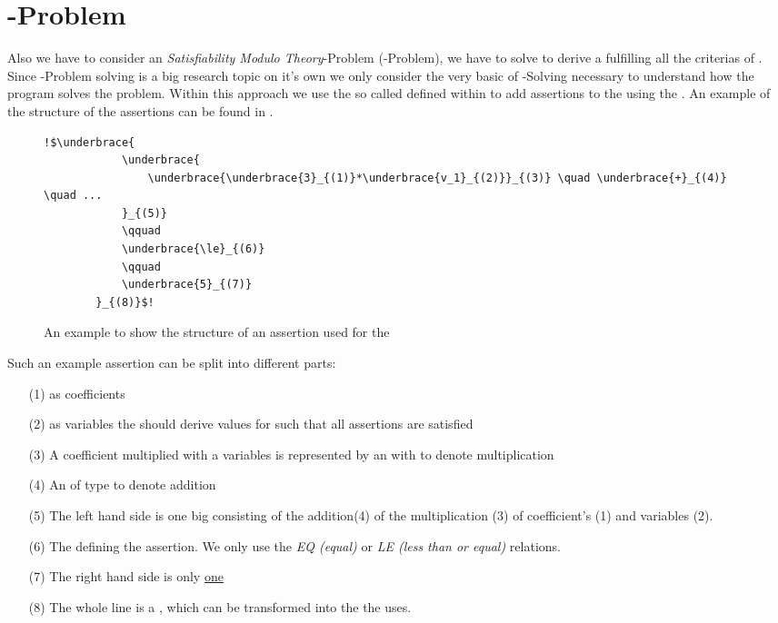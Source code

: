 \section{-Problem}
\label{sec:smt-problem}
Also we have to consider an \textit{Satisfiability Modulo Theory}-Problem (-Problem), we have to solve to derive a \gna fulfilling all the criterias of . Since -Problem solving is a big research topic on it's own we only consider the very basic of -Solving necessary to understand how the program solves the problem. \newline
Within this approach we use the so called  defined within \aprove to add assertions to the \solver using the \smtfactory. An example of the structure of the assertions can be found in . %

\begin{figure}[H]
	\begin{lstlisting}[escapechar = !]
		!$\underbrace{
			\underbrace{
				\underbrace{\underbrace{3}_{(1)}*\underbrace{v_1}_{(2)}}_{(3)} \quad \underbrace{+}_{(4)} \quad ...
			}_{(5)} 
			\qquad
			\underbrace{\le}_{(6)}
			\qquad
			\underbrace{5}_{(7)}
		}_{(8)}$!
	\end{lstlisting}
	\caption{An example to show the structure of an assertion used for the \solver}
	\label{ex:assertion-structure}
\end{figure}

Such an example assertion can be split into different parts: 
\begin{enumerate}
	\item[(1)]  as coefficients
	\item[(2)]  as variables the \solver should derive values for such that all assertions are satisfied
	\item[(3)] A coefficient multiplied with a variables is represented by an  with   to denote multiplication
	\item[(4)] An  of type  to denote addition
	\item[(5)] The left hand side is one big  consisting of the addition(4) of the multiplication (3) of coefficient's (1) and variables (2).
	\item[(6)] The  defining the assertion. We only use the \textit{EQ (equal)} or \textit{LE (less than or equal)} relations.
	\item[(7)] The right hand side is only \underline{one} 
	\item[(8)] The whole line is a , which can be transformed into the  the \solver uses.
\end{enumerate}

